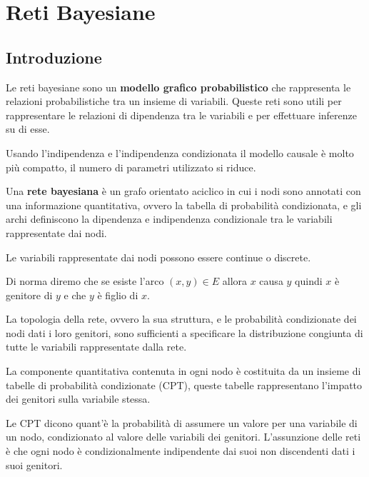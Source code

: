 \chapter{Reti Bayesiane} \label{cap:RetiBayesiane}
\section{Introduzione}
Le reti bayesiane sono un \textbf{modello grafico probabilistico} che rappresenta
le relazioni probabilistiche tra un insieme di variabili. Queste reti sono utili
per rappresentare le relazioni di dipendenza tra le variabili e per effettuare
inferenze su di esse.

Usando l'indipendenza e l'indipendenza condizionata il modello causale è molto
più compatto, il numero di parametri utilizzato si riduce.
\begin{definizione}
    Una \textbf{rete bayesiana} è un grafo orientato aciclico in cui i nodi sono
    annotati con una informazione quantitativa, ovvero la tabella di probabilità
    condizionata, e gli archi definiscono la dipendenza e indipendenza condizionale
    tra le variabili rappresentate dai nodi.
\end{definizione}
\begin{nota}
    Le variabili rappresentate dai nodi possono essere continue o discrete.
\end{nota}

Di norma diremo che se esiste l'arco $(x,y)\in E$ allora $x$ causa $y$ quindi
$x$ è genitore di $y$ e che $y$ è figlio di $x$.
\begin{center}
\end{center}

La topologia della rete, ovvero la sua struttura, e le probabilità condizionate
dei nodi dati i loro genitori, sono sufficienti a specificare la distribuzione
congiunta di tutte le variabili rappresentate dalla rete.

La componente quantitativa contenuta in ogni nodo è costituita da un insieme di
tabelle di probabilità condizionate (CPT), queste tabelle rappresentano l'impatto
dei genitori sulla variabile stessa.

Le CPT dicono quant'è la probabilità di assumere un valore per una variabile di
un nodo, condizionato al valore delle variabili dei genitori. L'assunzione delle
reti è che ogni nodo è condizionalmente indipendente dai suoi non discendenti
dati i suoi genitori.

